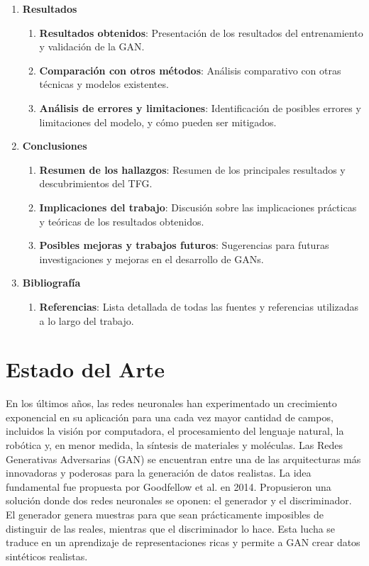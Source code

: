 \begin{enumerate}[label=\textbf{\arabic*.}]
    \item \textbf{Resultados}
    \begin{enumerate}[label=\textbf{\arabic*.}]
        \item \textbf{Resultados obtenidos}: Presentación de los resultados del entrenamiento y validación de la GAN.
        \item \textbf{Comparación con otros métodos}: Análisis comparativo con otras técnicas y modelos existentes.
        \item \textbf{Análisis de errores y limitaciones}: Identificación de posibles errores y limitaciones del modelo, y cómo pueden ser mitigados.
    \end{enumerate}

    \item \textbf{Conclusiones}
    \begin{enumerate}[label=\textbf{\arabic*.}]
        \item \textbf{Resumen de los hallazgos}: Resumen de los principales resultados y descubrimientos del TFG.
        \item \textbf{Implicaciones del trabajo}: Discusión sobre las implicaciones prácticas y teóricas de los resultados obtenidos.
        \item \textbf{Posibles mejoras y trabajos futuros}: Sugerencias para futuras investigaciones y mejoras en el desarrollo de GANs.
    \end{enumerate}

    \item \textbf{Bibliografía}
    \begin{enumerate}[label=\textbf{\arabic*.}]
        \item \textbf{Referencias}: Lista detallada de todas las fuentes y referencias utilizadas a lo largo del trabajo.
    \end{enumerate}

\end{enumerate}


\section{Estado del Arte}\label{sec:estado del arte}

En los últimos años, las redes neuronales han experimentado un crecimiento exponencial en su aplicación para una cada vez mayor cantidad de campos, incluidos la visión por computadora, el procesamiento del lenguaje natural, la robótica y, en menor medida, la síntesis de materiales y moléculas. Las Redes Generativas Adversarias (GAN) se encuentran entre una de las arquitecturas más innovadoras y poderosas para la generación de datos realistas. La idea fundamental fue propuesta por Goodfellow et al. en 2014. Propusieron una solución donde dos redes neuronales se oponen: el generador y el discriminador. El generador genera muestras para que sean prácticamente imposibles de distinguir de las reales, mientras que el discriminador lo hace. Esta lucha se traduce en un aprendizaje de representaciones ricas y permite a GAN crear datos sintéticos realistas.

